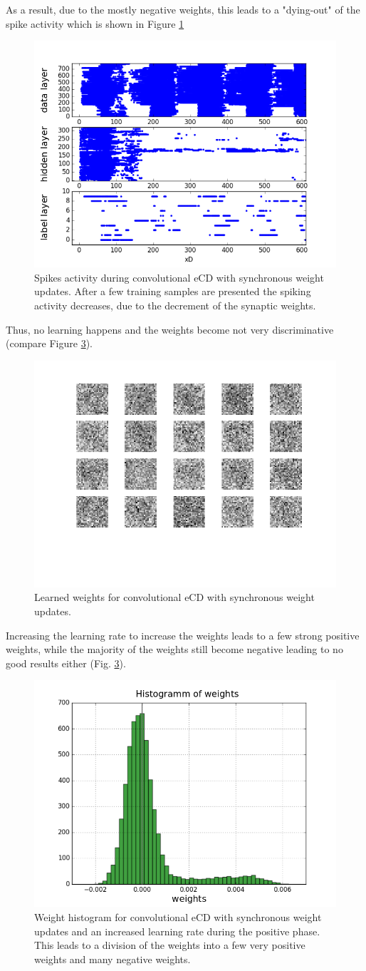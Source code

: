 As a result, due to the mostly negative weights, this leads to a "dying-out" of the spike activity which is shown in Figure \ref{fig:ecdnestdieout} 

\begin{figure}[h!]
 	\centering
  	\includegraphics[width=.4\linewidth]{imgs/app/nest/spikes_conv.png}
  	\caption[Spikes activity during convolutional eCD with synchronous weight updates.]{Spikes activity during convolutional eCD with synchronous weight updates. After a few training samples are presented the spiking activity decreases, due to the decrement of the synaptic weights.}
  	\label{fig:ecdnestdieout}
\end{figure}

Thus, no learning happens and the weights become not very discriminative (compare Figure \ref{fig:ecdnestwnot}).


\begin{figure}[h!]
 	\centering
  	\includegraphics[width=.4\linewidth]{imgs/app/nest/w_not.png}
  	\caption{Learned weights for convolutional eCD with synchronous weight updates.}
  	\label{fig:ecdnestwnot}
\end{figure}

Increasing the learning rate to increase the weights leads to a few strong positive weights, while the majority of the weights still become negative leading to no good results either (Fig. \ref{fig:ecdnestwnot}).


\begin{figure}[h!]
 	\centering
  	\includegraphics[width=.4\linewidth]{imgs/app/nest/w_hist_conv_lr.png}
  	\caption[Weight histogram for convolutional eCD with synchronous weight updates and an increased learning rate during the positive phase.]{Weight histogram for convolutional eCD with synchronous weight updates and an increased learning rate during the positive phase. This leads to a division of the weights into a few very positive weights and many negative weights. }
  	\label{fig:ecdnestwnot}
\end{figure}

